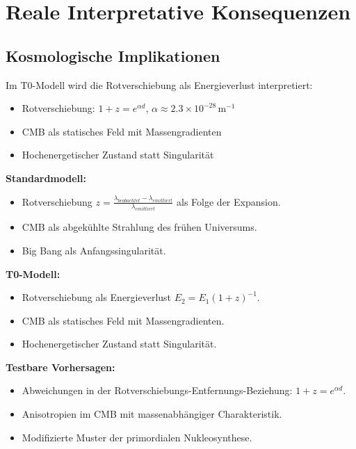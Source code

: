 \documentclass[a4paper,12pt]{article}
\begin{document}
	\section{Reale Interpretative Konsequenzen}
	\subsection{Kosmologische Implikationen}
	Im T0-Modell wird die Rotverschiebung als Energieverlust interpretiert:
	\begin{itemize}
		\item Rotverschiebung: \( 1 + z = e^{\alpha d} \), \( \alpha \approx 2.3 \times 10^{-28} \, \text{m}^{-1} \)
		\item CMB als statisches Feld mit Massengradienten
		\item Hochenergetischer Zustand statt Singularität
	\end{itemize}
	
	\begin{tcolorbox}[colback=green!5!white,colframe=green!75!black,title=Neuinterpretation kosmologischer Phänomene]
		\textbf{Standardmodell:}
		\begin{itemize}
			\item Rotverschiebung \( z = \frac{\lambda_{beobachtet} - \lambda_{emittiert}}{\lambda_{emittiert}} \) als Folge der Expansion.
			\item CMB als abgekühlte Strahlung des frühen Universums.
			\item Big Bang als Anfangssingularität.
		\end{itemize}
		\textbf{T0-Modell:}
		\begin{itemize}
			\item Rotverschiebung als Energieverlust \( E_2 = E_1(1+z)^{-1} \).
			\item CMB als statisches Feld mit Massengradienten.
			\item Hochenergetischer Zustand statt Singularität.
		\end{itemize}
		\textbf{Testbare Vorhersagen:}
		\begin{itemize}
			\item Abweichungen in der Rotverschiebungs-Entfernungs-Beziehung: \( 1 + z = e^{\alpha d} \).
			\item Anisotropien im CMB mit massenabhängiger Charakteristik.
			\item Modifizierte Muster der primordialen Nukleosynthese.
		\end{itemize}
	\end{tcolorbox}
	
\end{document}
